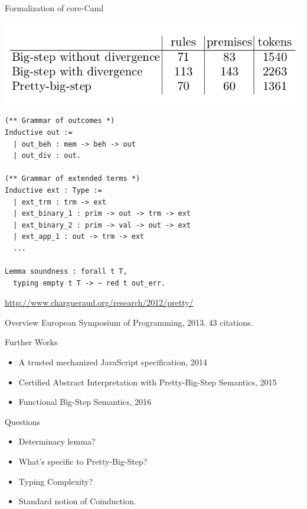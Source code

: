 \documentclass[page number,dvipsnames]{beamer}
\begin{document}
\begin{frame}[fragile]{Formalization of core-Caml}
  \begin{center}
    \includegraphics[scale=0.3]{tokens.png}
  \end{center}
  \vfill
  \begin{lstlisting}
(** Grammar of outcomes *)
Inductive out :=
  | out_beh : mem -> beh -> out
  | out_div : out.

(** Grammar of extended terms *)
Inductive ext : Type :=
  | ext_trm : trm -> ext
  | ext_binary_1 : prim -> out -> trm -> ext
  | ext_binary_2 : prim -> val -> out -> ext
  | ext_app_1 : out -> trm -> ext
  ...

Lemma soundness : forall t T, 
  typing empty t T -> ~ red t out_err.
  \end{lstlisting}
  \vfill
  \url{http://www.chargueraud.org/research/2012/pretty/}
\end{frame}

\begin{frame}{Overview}
  European Symposium of Programming, 2013. 43 citations.
  \vfill
  \begin{exampleblock}{Further Works}
    \begin{itemize}
    \item A trusted mechanized JavaScript specification, 2014
    \item Certified Abstract Interpretation with Pretty-Big-Step Semantics, 2015
    \item Functional Big-Step Semantics, 2016
    \end{itemize}
  \end{exampleblock}
  \vfill
  \begin{alertblock}{Questions}
    \begin{itemize}
    \item Determinacy lemma?
    \item What's specific to Pretty-Big-Step?
    \item Typing Complexity?
    \item Standard notion of Coinduction.
    \end{itemize}
  \end{alertblock}

\end{frame}
\end{document}
